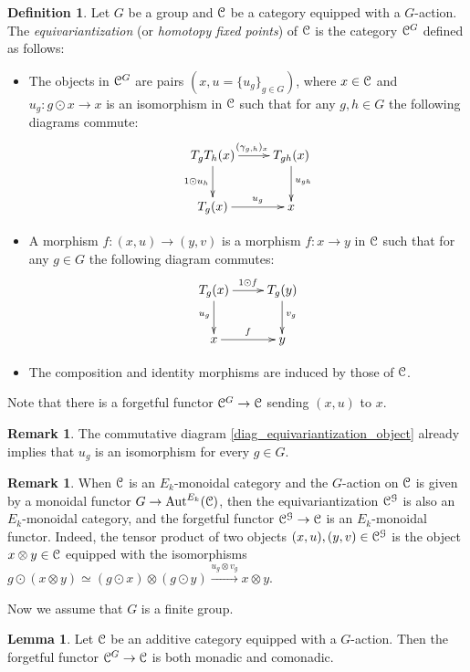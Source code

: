 \documentclass[10pt]{article}
\theoremstyle{definition}
\newtheorem{lem}[thm]{Lemma}
\newtheorem{defn}[thm]{Definition}
\newtheorem{rem}[thm]{Remark}
\numberwithin{equation}{section}
\numberwithin{thm}{section}
\newcommand{\be}{\begin{equation}}
\newcommand{\ee}{\end{equation}}
\newcommand{\bit}{\begin{itemize}}
\newcommand{\eit}{\end{itemize}}
\newcommand{\CC}{\EuScript{C}}
\newcommand{\CG}{\EuScript{G}}
\DeclareMathOperator{\Aut}{Aut}
\begin{document}
\begin{defn}
Let $G$ be a group and $\CC$ be a category equipped with a $G$-action. The \emph{equivariantization} (or \emph{homotopy fixed points}) of $\CC$ is the category $\CC^G$ defined as follows:
\bit
\item The objects in $\CC^G$ are pairs $(x,u = \{u_g\}_{g \in G})$, where $x \in \CC$ and $u_g \colon g \odot x \to x$ is an isomorphism in $\CC$ such that for any $g,h \in G$ the following diagrams commute:
\be \label{diag_equivariantization_object}
\begin{array}{c}
\xymatrix{
T_g T_h(x) \ar[r]^{(\gamma_{g,h})_x} \ar[d]_{1 \odot u_h} & T_{gh}(x) \ar[d]^{u_{gh}} \\
T_g(x) \ar[r]^-{u_g} & x
}
\end{array}
\ee
\item A morphism $f \colon (x,u) \to (y,v)$ is a morphism $f \colon x \to y$ in $\CC$ such that for any $g \in G$ the following diagram commutes:
\be \label{diag_equivariantization_morphism}
\begin{array}{c}
\xymatrix{
T_g(x) \ar[r]^{1 \odot f} \ar[d]_{u_g} & T_g(y) \ar[d]^{v_g} \\
x \ar[r]^{f} & y
}
\end{array}
\ee
\item The composition and identity morphisms are induced by those of $\CC$.
\eit
Note that there is a forgetful functor $\CC^G \to \CC$ sending $(x,u)$ to $x$.
\end{defn}

\begin{rem}
The commutative diagram \eqref{diag_equivariantization_object} already implies that $u_g$ is an isomorphism for every $g \in G$.
\end{rem}

\begin{rem}
When $\CC$ is an $E_k$-monoidal category and the $G$-action on $\CC$ is given by a monoidal functor $G \to \Aut^{E_k}(\CC)$, then the equivariantization $\CC^\CG$ is also an $E_k$-monoidal category, and the forgetful functor $\CC^\CG \to \CC$ is an $E_k$-monoidal functor. Indeed, the tensor product of two objects $(x,u),(y,v) \in \CC^\CG$ is the object $x \otimes y \in \CC$ equipped with the isomorphisms $g \odot (x \otimes y) \simeq (g \odot x) \otimes (g \odot y) \xrightarrow{u_g \otimes v_g} x \otimes y$.
\end{rem}

Now we assume that $G$ is a finite group.

\begin{lem} \label{lem_equivariantization_monadic_comonadic}
Let $\CC$ be an additive category equipped with a $G$-action. Then the forgetful functor $\CC^G \to \CC$ is both monadic and comonadic.
\end{lem}
\end{document}
